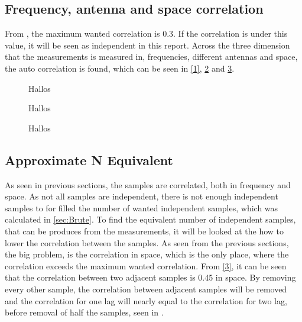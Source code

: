 \subsection{Frequency, antenna and space correlation}
From , the maximum wanted correlation is 0.3. If the correlation is under this value, it will be seen as independent in this report. Across the three dimension that the measurements is measured in, frequencies, different antennas and space, the auto correlation is found, which can be seen in \autoref{1}, \ref{2} and \ref{3}.

\begin{minipage}{0.33\textwidth}
\begin{figure}[H]

\caption{Hallos}
\label{1}
\end{figure}
\end{minipage}%
\begin{minipage}{0.33\textwidth}
\begin{figure}[H]

\caption{Hallos}
\label{2}
\end{figure}
\end{minipage}%
\begin{minipage}{0.33\textwidth}
\begin{figure}[H]

\caption{Hallos}
\label{3}
\end{figure}
\end{minipage}


\subsection{Approximate N Equivalent}


As seen in previous sections, the samples are correlated, both in frequency and space. As not all samples are independent, there is not enough independent samples to for filled the number of wanted independent samples, which was calculated in \autoref{sec:Brute}. To find the equivalent number of independent samples, that can be produces from the measurements, it will be looked at the how to lower the correlation between the samples. As seen from the previous sections, the big problem, is the correlation in space, which is the only place, where the correlation exceeds the maximum wanted correlation. From \autoref{3}, it can be seen that the correlation between two adjacent samples is 0.45 in space. By removing every other sample, the correlation between adjacent samples will be removed and the correlation for one lag will nearly equal to the correlation for two lag, before removal of half the samples, seen in .


